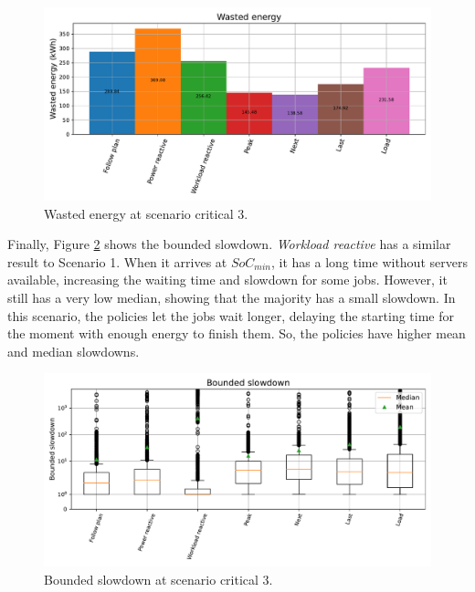 \begin{figure}[!htb]
    \centering
    \includegraphics[scale=0.55]{Images/Compensations/energy_critical_3.pdf}
    \caption{Wasted energy at scenario critical 3.}
    \label{fig:energy_critical_3}
\end{figure}

Finally, Figure \ref{fig:slowdown_critical_3} shows the bounded slowdown. \emph{Workload reactive} has a similar result to Scenario 1. When it arrives at $SoC_{min}$, it has a long time without servers available, increasing the waiting time and slowdown for some jobs. However, it still has a very low median, showing that the majority has a small slowdown. In this scenario, the policies let the jobs wait longer, delaying the starting time for the moment with enough energy to finish them. So, the policies have higher mean and median slowdowns. 

\begin{figure}[!htb]
    \centering
    \includegraphics[scale=0.55]{Images/Compensations/slowdown_critical_3.pdf}
    \caption{Bounded slowdown at scenario critical 3.}
    \label{fig:slowdown_critical_3}
\end{figure}


